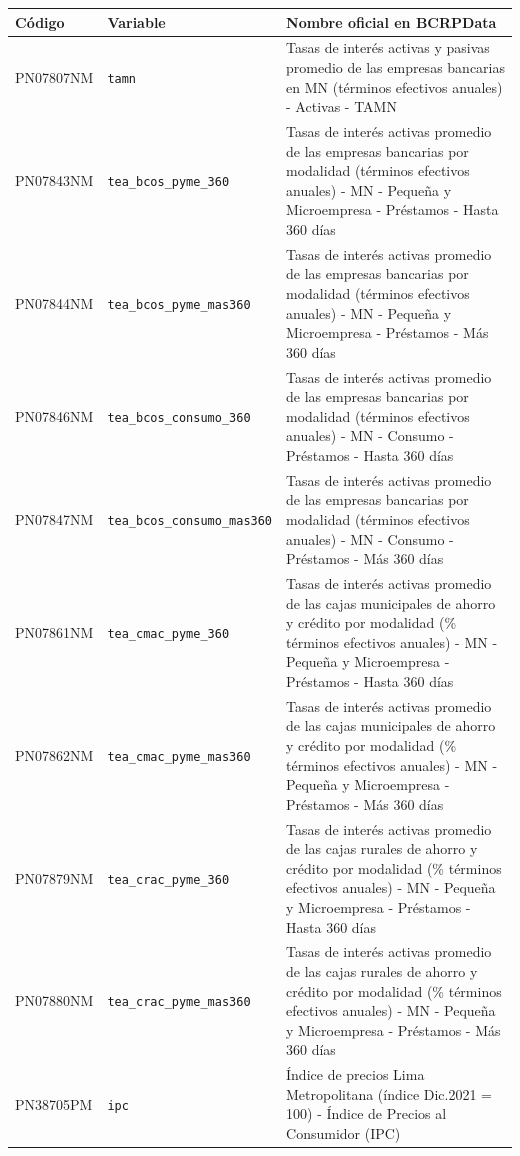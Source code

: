 {\small
\begin{longtable}{@{}>{\RaggedRight\arraybackslash}p{2.1cm}>{\RaggedRight\arraybackslash}p{4.8cm}>{\RaggedRight\arraybackslash}p{8.0cm}@{}}
\toprule
Código & Variable & Nombre oficial en BCRPData \\
\midrule
\endhead
PN07807NM & \texttt{tamn} & Tasas de interés activas y pasivas promedio de las empresas bancarias en MN (términos efectivos anuales) - Activas - TAMN \\
PN07843NM & \texttt{tea\_bcos\_pyme\_360} & Tasas de interés activas promedio de las empresas bancarias por modalidad (términos efectivos anuales) - MN - Pequeña y Microempresa - Préstamos - Hasta 360 días \\
PN07844NM & \texttt{tea\_bcos\_pyme\_mas360} & Tasas de interés activas promedio de las empresas bancarias por modalidad (términos efectivos anuales) - MN - Pequeña y Microempresa - Préstamos - Más 360 días \\
PN07846NM & \texttt{tea\_bcos\_consumo\_360} & Tasas de interés activas promedio de las empresas bancarias por modalidad (términos efectivos anuales) - MN - Consumo - Préstamos - Hasta 360 días \\
PN07847NM & \texttt{tea\_bcos\_consumo\_mas360} & Tasas de interés activas promedio de las empresas bancarias por modalidad (términos efectivos anuales) - MN - Consumo - Préstamos - Más 360 días \\
PN07861NM & \texttt{tea\_cmac\_pyme\_360} & Tasas de interés activas promedio de las cajas municipales de ahorro y crédito por modalidad (\% términos efectivos anuales) - MN - Pequeña y Microempresa - Préstamos - Hasta 360 días \\
PN07862NM & \texttt{tea\_cmac\_pyme\_mas360} & Tasas de interés activas promedio de las cajas municipales de ahorro y crédito por modalidad (\% términos efectivos anuales) - MN - Pequeña y Microempresa - Préstamos - Más 360 días \\
PN07879NM & \texttt{tea\_crac\_pyme\_360} & Tasas de interés activas promedio de las cajas rurales de ahorro y crédito por modalidad (\% términos efectivos anuales) - MN - Pequeña y Microempresa - Préstamos - Hasta 360 días \\
PN07880NM & \texttt{tea\_crac\_pyme\_mas360} & Tasas de interés activas promedio de las cajas rurales de ahorro y crédito por modalidad (\% términos efectivos anuales) - MN - Pequeña y Microempresa - Préstamos - Más 360 días \\
PN38705PM & \texttt{ipc} & Índice de precios Lima Metropolitana (índice Dic.2021 = 100) - Índice de Precios al Consumidor (IPC) \\
\bottomrule
\end{longtable}
}
